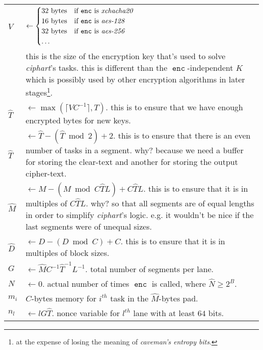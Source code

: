 \documentclass[twocolumn]{article}
\DeclareMathOperator{\enc}{\mathtt{enc}}
\DeclareMathOperator{\maxf}{max}
\begin{document}
\begin{tabularx}{\columnwidth}{lX}
    $V$ & $\gets \begin{cases}
                        32 \text{ bytes} & \text{if $\enc$ is
                                            \emph{xchacha20}}\\
                        16 \text{ bytes} & \text{if $\enc$ is
                            \emph{aes-128}}\\
                        32 \text{ bytes} & \text{if $\enc$ is
                            \emph{aes-256}}\\
                        \ldots & \\
                     \end{cases}$\\
                & this is the size of the encryption key that's used to
                    solve \emph{ciphart}'s tasks.  this is different than
                    the $\enc$-independent $K$ which is
                    possibly used by other encryption algorithms in later
                    stages\footnote{at the expense of losing the meaning of
                    \emph{caveman's entropy bits}.}.\\
    $\hat T$    & $\gets \maxf(\lceil V C^{-1}\rceil, T)$.  this
                    is to ensure that we have enough encrypted bytes for
                    new keys.\\
    $\hat T$    & $\gets \hat T - (\hat T \bmod 2) + 2$.  this is to ensure
                    that there is an even number of tasks in a segment.
                    why?  because we need a buffer for storing the
                    clear-text and another for storing the output
                    cipher-text.\\
    $\hat M$    & $\gets M - (M \bmod C\hat TL) + C\hat TL$.  this is to
                    ensure that it is in multiples of $C\hat TL$.  why?  so
                    that all segments are of equal lengths in order to
                    simplify \emph{ciphart}'s logic.  e.g. it wouldn't be
                    nice if the last segments were of unequal sizes.\\
    $\hat D$    & $\gets D - (D \bmod C) + C$.  this is to
                    ensure that it is in multiples of block sizes.\\
    $G$         & $\gets \hat MC^{-1}\hat T^{-1}L^{-1}$.  total number of
                    segments per lane.\\
    $N$    & $\gets 0$.  actual number of times $\enc$ is called,
                    where $\hat N \ge 2^B$.\\
    $m_i$       & $C$-bytes memory for $i^{th}$ task in the $\hat M$-bytes
                    pad.\\
    $n_l$       & $\gets lG\hat T$.  nonce variable for $l^{th}$ lane with
                    at least $64$ bits.\\
\end{tabularx}
\end{document}
